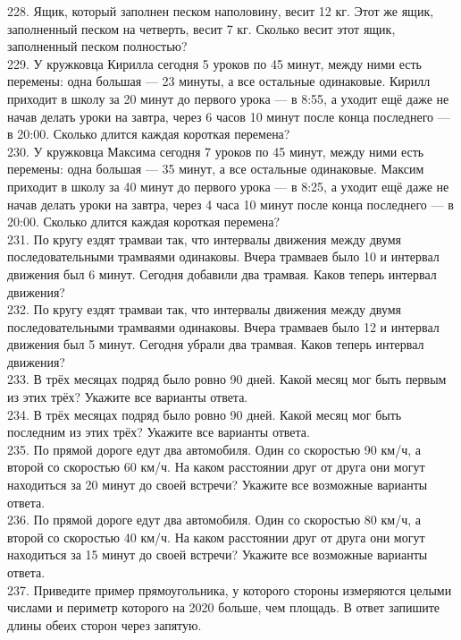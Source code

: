 228. Ящик, который заполнен песком наполовину, весит 12 кг. Этот же ящик, заполненный песком на четверть, весит 7 кг. Сколько весит этот ящик, заполненный песком полностью?\\
229. У кружковца Кирилла сегодня 5 уроков по 45 минут, между ними есть перемены: одна большая --- 23 минуты, а все остальные одинаковые. Кирилл приходит в школу за 20 минут до первого урока --- в 8:55, а уходит ещё даже не начав делать уроки на завтра, через 6 часов 10 минут после конца последнего --- в 20:00. Сколько длится каждая короткая перемена?\\
230. У кружковца Максима сегодня 7 уроков по 45 минут, между ними есть перемены: одна большая --- 35 минут, а все остальные одинаковые. Максим приходит в школу за 40 минут до первого урока --- в 8:25, а уходит ещё даже не начав делать уроки на завтра, через 4 часа 10 минут после конца последнего --- в 20:00. Сколько длится каждая короткая перемена?\\
231. По кругу ездят трамваи так, что интервалы движения между двумя последовательными трамваями одинаковы. Вчера трамваев было 10 и интервал движения был 6 минут. Сегодня добавили два трамвая. Каков теперь интервал движения?\\
232. По кругу ездят трамваи так, что интервалы движения между двумя последовательными трамваями одинаковы. Вчера трамваев было 12 и интервал движения был 5 минут. Сегодня убрали два трамвая. Каков теперь интервал движения?\\
233. В трёх месяцах подряд было ровно 90 дней. Какой месяц мог быть первым из этих трёх? Укажите все варианты ответа.\\
234. В трёх месяцах подряд было ровно 90 дней. Какой месяц мог быть последним из этих трёх? Укажите все варианты ответа.\\
235. По прямой дороге едут два автомобиля. Один со скоростью 90 км/ч, а второй со скоростью 60 км/ч. На каком расстоянии друг от друга они могут находиться за 20 минут до своей встречи? Укажите все возможные варианты ответа.\\
236. По прямой дороге едут два автомобиля. Один со скоростью 80 км/ч, а второй со скоростью 40 км/ч. На каком расстоянии друг от друга они могут находиться за 15 минут до своей встречи? Укажите все возможные варианты ответа.\\
237. Приведите пример прямоугольника, у которого стороны измеряются целыми числами и периметр которого на 2020 больше, чем площадь. В ответ запишите длины обеих сторон через запятую.\\
